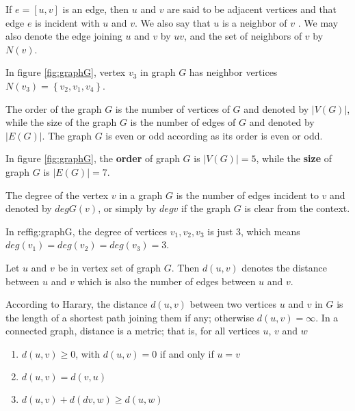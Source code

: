 \begin{defn}\rm
\cite{lapura}If $e = [u, v]$ is an edge, then $u$ and $v$ are said to be adjacent vertices and that edge $e$ is incident with $u$ and $v$. We also say that $u$ is a neighbor of $v$ . We may also denote the edge joining $u$ and $v$ by $uv$, and the set of neighbors of $v$ by $N(v)$.
\end{defn}

\begin{e.g.}\rm
In figure \ref{fig:graphG}, vertex $v_3$ in graph $G$ has neighbor vertices $N(v_3)=\left\lbrace v_2,v_1,v_4 \right\rbrace $. 
\end{e.g.}

\begin{defn} \rm
\cite{lapura}The order of the graph $G$ is the number of vertices of $G$ and denoted by $|V (G)|$, while the size of the graph $G$ is the number of edges of $G$
and denoted by $|E(G)|$. The graph $G$ is even or odd according as its order is
even or odd.
\end{defn}

\begin{e.g.}\rm
In figure \ref{fig:graphG}, the \textbf{order} of graph $G$ is $|V(G)|=5$, while the \textbf{size} of graph $G$ is $|E(G)|=7$. 
\end{e.g.}

\begin{defn}\rm
\cite{gt}The degree of the vertex $v$ in a graph $G$ is the number of
edges incident to $v$ and denoted by $degG(v)$, or simply by $deg v$ if the graph $G$ is clear from the context.
\end{defn}

\begin{e.g.}\rm
In \figure ref{fig:graphG}, the degree of vertices $v_1,v_2,v_3$ is just $3$, which means $deg(v_1)=deg(v_2)=deg(v_3)=3$.
\end{e.g.}

\begin{defn} \rm
\cite{lapura} Let $u$ and $v$ be in vertex set of graph $G$. Then $d(u,v)$ denotes the distance between $u$ and $v$ which is also the number of edges between $u$ and $v$.
\end{defn}

\begin{defn}\rm
\cite{hararygt} According to Harary, the distance $d(u,v)$ between two vertices $u$ and $v$ in $G$ is the length of a shortest path joining them if any; otherwise $d(u,v)=\infty$. In a connected graph, distance is a metric; that is, for all vertices $u$, $v$ and $w$

\begin{enumerate}
\item $d(u,v)\geq 0$, with $d(u,v)=0$ if and only if $u=v$
\item $d(u,v)=d(v,u)$
\item $d(u,v)+d(dv,w)\geq d(u,w)$
\end{enumerate}

\end{defn}

